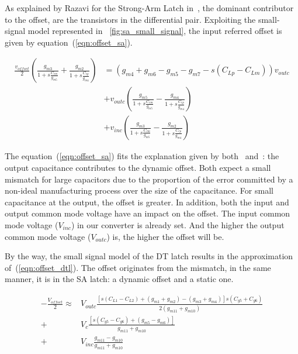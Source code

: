 As explained by Razavi for the Strong-Arm Latch in~\cite{Razavi2015}, the dominant contributor to the offset, are the transistors in the differential pair. Exploiting the small-signal model represented in \figurename~\ref{fig:sa_small_signal}, the input referred offset is given by equation~(\ref{eqn:offset_sa}).

\begin{align}
    \label{eqn:offset_sa}
    \frac{v_{offset}}{2} \left( \frac{g_{m3}}{1+s\frac{C_{cm}}{g_{m5}}} + \frac{g_{m2}}{1+s\frac{C_{cp}}{g_{m4}}} \right) &= \left( g_{m4}+g_{m6}-g_{m5}-g_{m7}-s\left(C_{Lp}-C_{Lm}\right) \right) v_{outc} \\
    &+ v_{outc} \left( \frac{g_{m5}}{1+s\frac{C_{cm}}{g_{m5}}} - \frac{g_{m4}}{1+s\frac{C_{cp}}{g_{m4}}} \right) \nonumber \\
    &+ v_{inc} \left( \frac{g_{m3}}{1+s\frac{C_{cm}}{g_{m5}}} - \frac{g_{m2}}{1+s\frac{C_{cp}}{g_{m4}}} \right) \nonumber
\end{align}

The equation~(\ref{eqn:offset_sa}) fits the explanation given by both~\cite{Razavi2015} and~\cite{Abidi2014}: the output capacitance contributes to the dynamic offset. Both expect a small mismatch for large capacitors due to the proportion of the error committed by a non-ideal manufacturing process over the size of the capacitance. For small capacitance at the output, the offset is greater. In addition, both the input and output common mode voltage have an impact on the offset. The input common mode voltage (\(V_{inc}\)) in our converter is already set. And the higher the output common mode voltage (\(V_{outc}\)) is, the higher the offset will be.

By the way, the small signal model of the DT latch results in the approximation of~(\ref{eqn:offset_dtl}). The offset originates from the mismatch, in the same manner, it is in the SA latch: a dynamic offset and a static one.

\begin{align}
\label{eqn:offset_dtl}
-\frac{V_{offset}}{2} \approx & V_{outc}\frac{\left[s \left(C_{L1} - C_{L2}\right) + \left(g_{m1}+g_{m2}\right) -\left(g_{m3}+g_{m4}\right)\right] s \left(C_{g5} + C_{g6}\right)}{2(g_{m11}+g_{m10})}\\
+ & V_c \frac{\left[s \left(C_{g5}-C_{g6}\right) + \left(g_{m5}-g_{m6}\right)\right]}{g_{m11}+g_{m10}}  \nonumber  \\
+ & V_{inc}\frac{g_{m11}-g_{m10}}{g_{m11}+g_{m10}} \nonumber
\end{align}

